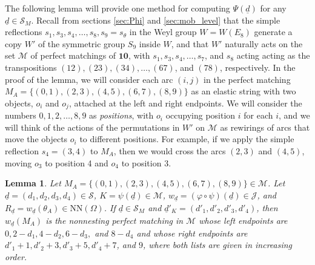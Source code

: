 \documentclass[11pt]{amsart}
\theoremstyle{plain}
\newtheorem{lemma}[theorem]{Lemma}
\theoremstyle{definition}
\theoremstyle{remark}
\numberwithin{equation}{section}
\newcommand{\seqd}{\underline{d}}
\newcommand{\calj}{\mathcal{J}}
\newcommand{\calm}{\mathcal{M}}
\newcommand{\cals}{\mathcal{S}}
\newcommand{\ten}{\mathbf{10}}
\newcommand{\ob}{\Omega}
\newcommand{\nn}{\mathrm{NN}}
\begin{document}
The following lemma will provide one method for computing $\Psi(\seqd)$ for any
$\seqd\in \cals_M$. Recall from sections \ref{sec:Phi} and \ref{sec:mob_level} that
the simple reflections $s_1, s_3, s_4, \dots, s_8, s_9=s_\theta$ in the Weyl
group $W=W(E_8)$ generate a copy $W'$ of the symmetric group $S_9$ inside $W$,
and that $W'$ naturally acts on the set $\calm$ of perfect matchings of $\ten$,
with $s_1, s_3, s_4, \dots, s_7$, and $s_8$ acting acting as the transpositions
$(12), (23), (34),\dots, (67)$, and $(78)$, respectively.  In the proof of the
 lemma, we will consider each arc $(i,j)$ in the perfect matching
$M_A=\{(0,1),(2,3), (4,5), (6,7), (8,9)\}$ as an elastic string with two
objects, $o_i$ and $o_j$, attached at the left and right endpoints.
We will consider the numbers $0,1,2,\dots, 8,9$ as \emph{positions}, with $o_i$
occupying position $i$ for each $i$, and we will think of the actions of the
permutations in $W'$ on $\calm$ as rewirings of arcs that move the objects $o_i$
to different positions. For example, if we apply the simple reflection
$s_4=(3,4)$ to $M_A$, then we would cross the arcs $(2,3)$ and $(4,5)$, moving
$o_3$ to position 4 and $o_4$ to position 3. 


\begin{lemma}
\label{lem:lr}
Let $M_A=\{(0,1),(2,3), (4,5), (6,7), (8,9)\}\in
\calm$. Let $\seqd=(d_1,d_2,d_3,d_4)\in \cals$, $K=\psi(\seqd)\in \calm$,
$w_{\seqd}=(\varphi\circ\psi)(\seqd)\in \calj$, and $R_{\seqd}=w_{\seqd}(\theta_A)\in \nn(\ob)$. If
$\seqd\in\cals_M$ and $\seqd'_K=(d'_1,d'_2,d'_3,d'_4)$, then $w_{\seqd}(M_A)$ is the
nonnesting perfect matching in $\calm$ whose left endpoints are
$0,2-d_1,4-d_2,6-d_3,$ and $8-d_4$ and whose right endpoints are $d'_1+1,
d'_2+3, d'_3+5, d'_4+7$, and $9$, where both lists are given in increasing
order. 
\end{lemma}
\end{document}
